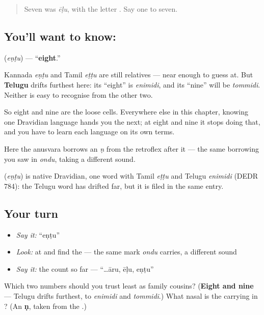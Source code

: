 \label{lesson:KA-C07-entu}



\begin{quote}
Seven was \emph{ēḷu}, with the letter . Say one to seven.
\end{quote}

\subsection*{You'll want to know: }
\textbf{} (\emph{eṇṭu}) — \textquotedblleft{}\textbf{eight}.\textquotedblright{}

Kannada \emph{eṇṭu} and Tamil \emph{eṭṭu} are still relatives — near enough to guess at. But \textbf{Telugu} drifts furthest here: its \textquotedblleft{}eight\textquotedblright{} is \emph{enimidi}, and its \textquotedblleft{}nine\textquotedblright{} will be \emph{tommidi}. Neither is easy to recognise from the other two.

So eight and nine are the loose cells. Everywhere else in this chapter, knowing one Dravidian language hands you the next; at eight and nine it stops doing that, and you have to learn each language on its own terms.

Here the anusvara \textbf{} borrows an \emph{ṇ} from the retroflex \textbf{} after it — the same borrowing you saw in \emph{ondu}, taking a different sound.

\begin{cousinweb}
\textbf{} (\emph{eṇṭu}) is native Dravidian, one word with Tamil \emph{eṭṭu} and Telugu \emph{enimidi} (DEDR 784): the Telugu word has drifted far, but it is filed in the same entry.
\end{cousinweb}

\subsection*{Your turn}
\begin{itemize}
\raggedright
  \item \emph{Say it:} \textquotedblleft{}eṇṭu\textquotedblright{}
  \item \emph{Look:} at  and find the  — the same mark \emph{ondu} carries, a different sound
  \item \emph{Say it:} the count so far — \textquotedblleft{}…āru, ēḷu, eṇṭu\textquotedblright{}
\end{itemize}

\begin{tcolorbox}[breakable,colback=teal!4,colframe=teal!35!black,title={Before you move on}]
Which two numbers should you trust least as family cousins? (\textbf{Eight and nine} — Telugu drifts furthest, to \emph{enimidi} and \emph{tommidi}.) What nasal is the  carrying in ? (An \textbf{ṇ}, taken from the .)
\end{tcolorbox}
